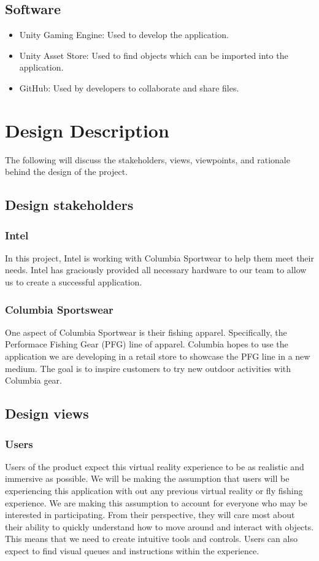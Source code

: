 \documentclass[10pt,journal,compsoc,onecolumn, draftclsnofoot]{IEEEtran}
\begin{document}
\subsection{Software}
\begin{itemize}
  \item Unity Gaming Engine: Used to develop the application.
  \item Unity Asset Store: Used to find objects which can be imported into the application.
  \item GitHub: Used by developers to collaborate and share files.
\end{itemize}


\section{Design Description}
The following will discuss the stakeholders, views, viewpoints, and rationale behind the design of the project.
\subsection{Design stakeholders}
\subsubsection{Intel}
In this project, Intel is working with Columbia Sportwear to help them meet their needs.
Intel has graciously provided all necessary hardware to our team to allow us to create a successful application.

\subsubsection{Columbia Sportswear}
One aspect of Columbia Sportwear is their fishing apparel.
Specifically, the Performace Fishing Gear (PFG) line of apparel.
Columbia hopes to use the application we are developing in a retail store to showcase the PFG line in a new medium.
The goal is to inspire customers to try new outdoor activities with Columbia gear.

\subsection{Design views}
\subsubsection{Users}
Users of the product expect this virtual reality experience to be as realistic and immersive as possible. We will be making the assumption that users will be experiencing this application with out any previous virtual reality or fly fishing experience. We are making this assumption to account for everyone who may be interested in participating. From their perspective, they will care most about their ability to quickly understand how to move around and interact with objects. This means that we need to create intuitive tools and controls. Users can also expect to find visual queues and instructions within the experience.
\end{document}
